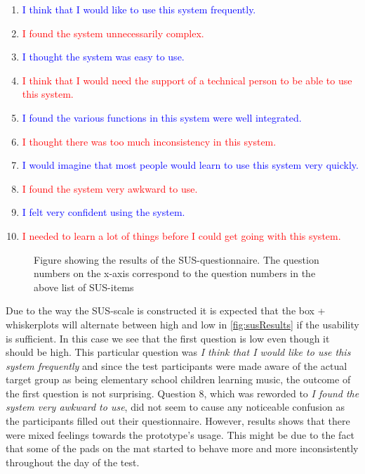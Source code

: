 \begin{enumerate}
	\item  \textcolor{blue}{I think that I would like to use this system frequently.}
	\item  \textcolor{red}{I found the system unnecessarily complex.}
	\item  \textcolor{blue}{I thought the system was easy to use.}
	\item  \textcolor{red}{I think that I would need the support of a technical person to be able to use this system.}
	\item  \textcolor{blue}{I found the various functions in this system were well integrated.}
	\item  \textcolor{red}{I thought there was too much inconsistency in this system.}
	\item  \textcolor{blue}{I would imagine that most people would learn to use this system very quickly.}
	\item  \textcolor{red}{I found the system very awkward to use.}
	\item  \textcolor{blue}{I felt very confident using the system.}
	\item  \textcolor{red}{I needed to learn a lot of things before I could get going with this system.}
\end{enumerate} 

\begin{figure}[H]
	\centering
	
	\caption{Figure showing the results of the SUS-questionnaire. The question numbers on the x-axis correspond to the question numbers in the above list of SUS-items}	
	\label{fig:susResults}
\end{figure}

Due to the way the SUS-scale is constructed it is expected that the box + whiskerplots will alternate between high and low in \autoref{fig:susResults} if the usability is sufficient. In this case we see that the first question is low even though it should be high. This particular question was \textit{I think that I would like to use this system frequently} and since the test participants were made aware of the actual target group as being elementary school children learning music, the outcome of the first question is not surprising. Question 8, which was reworded to \textit{I found the system very awkward to use}, did not seem to cause any noticeable confusion as the participants filled out their questionnaire. However, results shows that there were mixed feelings towards the prototype's usage. This might be due to the fact that some of the pads on the mat started to behave more and more inconsistently throughout the day of the test.

